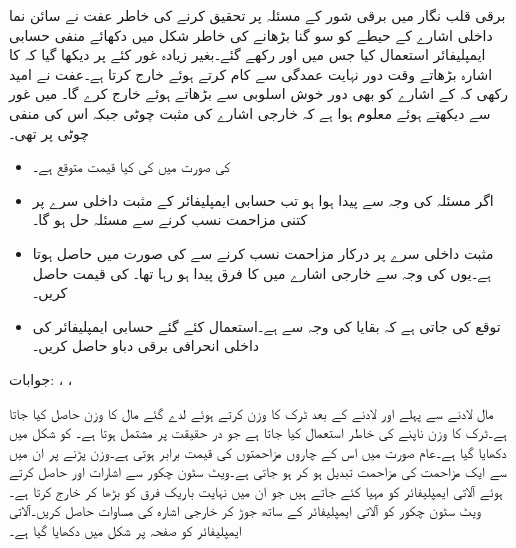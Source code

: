 برقی قلب نگار میں برقی شور کے مسئلہ پر تحقیق کرنے کی خاطر عفت نے سائن نما داخلی اشارے کے حیطے کو سو گنا بڑھانے کی خاطر  شکل  میں دکھائے منفی حسابی ایمپلیفائر استعمال کیا جس میں   اور  رکھے گئے۔بغیر زیادہ غور کئے  پر دیکھا گیا کہ  کا اشارہ بڑھاتے وقت دور نہایت عمدگی سے کام کرتے ہوئے  خارج کرتا ہے۔عفت نے امید رکھی کہ  کے اشارے کو بھی دور خوش اسلوبی سے بڑھاتے ہوئے  خارج کرے گا۔ میں غور سے دیکھتے ہوئے معلوم ہوا ہے کہ خارجی اشارے  کی مثبت چوٹی  جبکہ اس کی منفی چوٹی  پر تھی۔

\begin{itemize}
\item
{} کی صورت میں  کی کیا قیمت متوقع ہے۔
\item
اگر مسئلہ  کی وجہ سے پیدا ہوا ہو تب حسابی ایمپلیفائر کے مثبت داخلی سرے  پر  کتنی مزاحمت نسب کرنے سے مسئلہ حل ہو گا۔
\item
مثبت داخلی سرے  پر درکار مزاحمت نسب کرنے سے  کی صورت میں  حاصل ہوتا ہے۔یوں  کی وجہ سے خارجی اشارے میں  کا فرق پیدا ہو رہا تھا۔ کی قیمت حاصل کریں۔
\item 
توقع کی جاتی ہے کہ بقایا   کی وجہ سے ہے۔استعمال کئے گئے حسابی ایمپلیفائر کی داخلی انحرافی برقی دباو  حاصل کریں۔
\end{itemize}
جوابات: ،  ،  


مال لادنے سے پہلے اور لادنے کے بعد ٹرک کا وزن   کرتے ہوئے لدے گئے مال کا وزن حاصل کیا جاتا ہے۔ٹرک کا وزن ناپنے کی خاطر  استعمال کیا جاتا ہے جو در حقیقت  پر مشتمل ہوتا ہے۔ کو شکل  میں دکھایا گیا ہے۔عام صورت میں اس کے چاروں مزاحمتوں کی قیمت برابر  ہوتی ہے۔وزن پڑنے پر ان میں سے ایک مزاحمت کی مزاحمت تبدیل ہو کر  ہو جاتی ہے۔ویٹ سٹون چکور سے اشارات  اور  حاصل کرتے ہوئے آلاتی ایمپلیفائر کو مہیا کئے جاتے ہیں جو ان میں نہایت باریک فرق  کو بڑھا کر خارج کرتا ہے۔ویٹ سٹون چکور کو آلاتی ایمپلیفائر کے ساتھ جوڑ کر خارجی اشارہ  کی مساوات حاصل کریں۔آلاتی ایمپلیفائر کو  صفحہ  \pageref{شکل_حسابی_آلاتی_ایمپلیفائر} پر شکل  میں دکھایا گیا ہے۔

